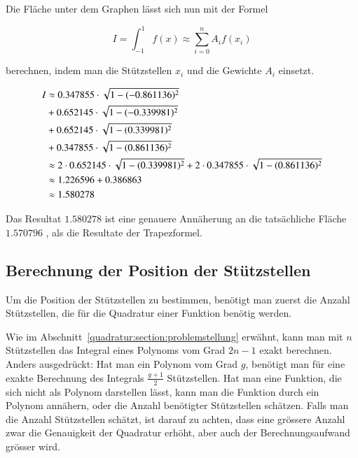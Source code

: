 Die Fläche unter dem Graphen lässt sich nun mit der Formel 

\begin{equation}
    I 
    =
    \int_{-1}^{1} f(x) 
    \approx
    \sum_{i=0}^{n} A_{i} f(x_{i})
\end{equation}
 
berechnen, indem man die Stützstellen $x_{i}$ und die Gewichte $A_{i}$ einsetzt.

    \begin{align}
        \centering
        I 
        &\approx 
        0.347855 \cdot \sqrt{1-(-0.861136)^{2}} 
        \notag
        \\
        &+ 
        0.652145 \cdot \sqrt{1-(-0.339981)^{2}} 
        \notag
        \\
        &+ 
        0.652145 \cdot \sqrt{1-(0.339981)^{2}} 
        \notag
        \\
        &+ 
        0.347855 \cdot \sqrt{1-(0.861136)^{2}} 
        \notag
        \\
        &\approx 2 \cdot 0.652145 \cdot \sqrt{1-(0.339981)^{2}} + 2 \cdot 0.347855 \cdot \sqrt{1-(0.861136)^{2}} 
        \notag
        \\
        &\approx 1.226596 + 0.386863 
        \notag
        \\
        &\approx 1.580278
    \end{align}


Das Resultat $1.580278$ ist eine genauere Annäherung an die tatsächliche Fläche $1.570796$ 
, als die Resultate der Trapezformel. 

\subsection{Berechnung der Position der Stützstellen
\label{quadratur:subsection:stützstellenberechnung}}
Um die Position der Stützstellen zu bestimmen, benötigt man zuerst die Anzahl Stützstellen, 
die für die Quadratur einer Funktion benötig werden.

Wie im Abschnitt~\ref{quadratur:section:problemstellung} erwähnt, 
kann man mit $n$ Stützstellen das Integral eines Polynoms vom Grad $2n-1$ exakt berechnen.
Anders ausgedrückt: Hat man ein Polynom vom Grad $g$, 
benötigt man für eine exakte Berechnung des Integrals $\frac{g+1}{2}$ Stützstellen.
Hat man eine Funktion, die sich nicht als Polynom darstellen lässt, 
kann man die Funktion durch ein Polynom annähern, 
oder die Anzahl benötigter Stützstellen schätzen.
Falls man die Anzahl Stützstellen schätzt, ist darauf zu achten, 
dass eine grössere Anzahl zwar die Genauigkeit der Quadratur erhöht,
aber auch der Berechnungsaufwand grösser wird.


